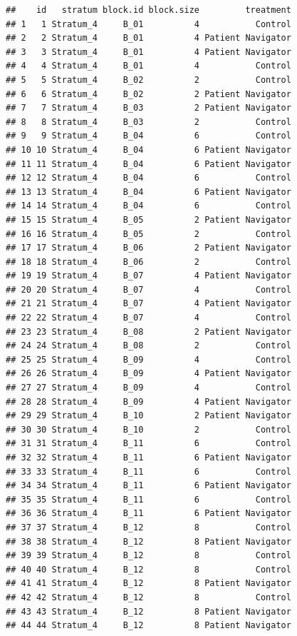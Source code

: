 \documentclass[
]{book}
\begin{document}
\begin{verbatim}
##    id   stratum block.id block.size         treatment
## 1   1 Stratum_4     B_01          4           Control
## 2   2 Stratum_4     B_01          4 Patient Navigator
## 3   3 Stratum_4     B_01          4 Patient Navigator
## 4   4 Stratum_4     B_01          4           Control
## 5   5 Stratum_4     B_02          2           Control
## 6   6 Stratum_4     B_02          2 Patient Navigator
## 7   7 Stratum_4     B_03          2 Patient Navigator
## 8   8 Stratum_4     B_03          2           Control
## 9   9 Stratum_4     B_04          6           Control
## 10 10 Stratum_4     B_04          6 Patient Navigator
## 11 11 Stratum_4     B_04          6 Patient Navigator
## 12 12 Stratum_4     B_04          6           Control
## 13 13 Stratum_4     B_04          6 Patient Navigator
## 14 14 Stratum_4     B_04          6           Control
## 15 15 Stratum_4     B_05          2 Patient Navigator
## 16 16 Stratum_4     B_05          2           Control
## 17 17 Stratum_4     B_06          2 Patient Navigator
## 18 18 Stratum_4     B_06          2           Control
## 19 19 Stratum_4     B_07          4 Patient Navigator
## 20 20 Stratum_4     B_07          4           Control
## 21 21 Stratum_4     B_07          4 Patient Navigator
## 22 22 Stratum_4     B_07          4           Control
## 23 23 Stratum_4     B_08          2 Patient Navigator
## 24 24 Stratum_4     B_08          2           Control
## 25 25 Stratum_4     B_09          4           Control
## 26 26 Stratum_4     B_09          4 Patient Navigator
## 27 27 Stratum_4     B_09          4           Control
## 28 28 Stratum_4     B_09          4 Patient Navigator
## 29 29 Stratum_4     B_10          2 Patient Navigator
## 30 30 Stratum_4     B_10          2           Control
## 31 31 Stratum_4     B_11          6           Control
## 32 32 Stratum_4     B_11          6 Patient Navigator
## 33 33 Stratum_4     B_11          6           Control
## 34 34 Stratum_4     B_11          6 Patient Navigator
## 35 35 Stratum_4     B_11          6           Control
## 36 36 Stratum_4     B_11          6 Patient Navigator
## 37 37 Stratum_4     B_12          8           Control
## 38 38 Stratum_4     B_12          8 Patient Navigator
## 39 39 Stratum_4     B_12          8           Control
## 40 40 Stratum_4     B_12          8           Control
## 41 41 Stratum_4     B_12          8 Patient Navigator
## 42 42 Stratum_4     B_12          8           Control
## 43 43 Stratum_4     B_12          8 Patient Navigator
## 44 44 Stratum_4     B_12          8 Patient Navigator

\end{verbatim}
\end{document}
